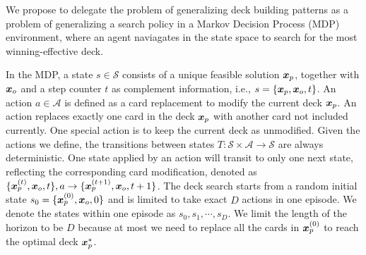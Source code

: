 


We propose to delegate the problem of generalizing deck building patterns as a problem of generalizing a search policy in a Markov Decision Process (MDP)~\cite{bellman1957markovian} environment, where an agent naviagates in the state space to search for the most winning-effective deck. 

In the MDP, a state $s \in \mathcal{S}$ consists of a unique feasible solution $\boldsymbol{x}_p$, together with $\boldsymbol{x}_o$ and a step counter $t$ as complement information, i.e., $s=\{\boldsymbol{x}_p, \boldsymbol{x}_o, t\}$. An action $a \in \mathcal{A}$ is defined as a card replacement to modify the current deck $\boldsymbol{x}_p$. An action replaces exactly one card in the deck $\boldsymbol{x}_p$ with another card not included currently. One special action is to keep the current deck as unmodified. Given the actions we define, the transitions between states $T: \mathcal{S} \times \mathcal{A} \rightarrow \mathcal{S}$ are always deterministic. One state applied by an action will transit to only one next state, reflecting the corresponding card modification, denoted as $\{\boldsymbol{x}^{(t)}_p, \boldsymbol{x}_o, t\}, a \rightarrow \{\boldsymbol{x}^{(t+1)}_p, \boldsymbol{x}_o, t+1\}$. The deck search starts from a random initial state $s_0=\{\boldsymbol{x}_p^{(0)}, \boldsymbol{x}_o, 0\}$ and is limited to take exact $D$ actions in one episode. We denote the states within one episode as $s_0, s_1, \cdots, s_D$. We limit the length of the horizon to be $D$ because at most we need to replace all the cards in $\boldsymbol{x}_p^{(0)}$ to reach the optimal deck $\boldsymbol{x}_p^*$. 


